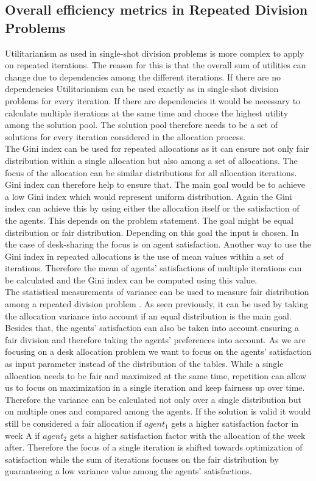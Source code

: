 \documentclass[german, a4paper, 11pt, oneside]{scrbook}
\begin{document}
\subsection{Overall efficiency metrics in Repeated Division Problems}
Utilitarianism as used in single-shot division problems is more complex to apply on repeated iterations. The reason for this is that the overall sum of utilities can change due to dependencies among the different iterations. If there are no dependencies Utilitarianism can be used exactly as in single-shot division problems for every iteration. If there are dependencies it would be necessary to calculate multiple iterations at the same time and choose the highest utility among the solution pool. The solution pool therefore needs to be a set of solutions for every iteration considered in the allocation process.\\
The Gini index can be used for repeated allocations as it can ensure not only fair distribution within a single allocation but also among a set of allocations. The focus of the allocation can be similar distributions for all allocation iterations. Gini index can therefore help to ensure that. The main goal would be to achieve a low Gini index which would represent uniform distribution. Again the Gini index can achieve this by using either the allocation itself or the satisfaction of the agents. This depends on the problem statement. The goal might be equal distribution or fair distribution. Depending on this goal the input is chosen. In the case of desk-sharing the focus is on agent satisfaction. Another way to use the Gini index in repeated allocations is the use of mean values within a set of iterations. Therefore the mean of agents' satisfactions of multiple iterations can be calculated and the Gini index can be computed using this value. 
\\
The statistical measurements of variance can be used to measure fair distribution among a repeated division problem \cite{Ek}. As seen previously, it can be used by taking the allocation variance into account if an equal distribution is the main goal. Besides that, the agents' satisfaction can also be taken into account ensuring a fair division and therefore taking the agents' preferences into account. As we are focusing on a desk allocation problem we want to focus on the agents' satisfaction as input parameter instead of the distribution of the tables. While a single allocation needs to be fair and maximized at the same time, repetition can allow us to focus on maximization in a single iteration and keep fairness up over time. Therefore the variance can be calculated not only over a single distribution but on multiple ones and compared among the agents. If the solution is valid it would still be considered a fair allocation if $agent_1$ gets a higher satisfaction factor in week A if $agent_2$ gets a higher satisfaction factor with the allocation of the week after. Therefore the focus of a single iteration is shifted towards optimization of satisfaction while the sum of iterations focuses on the fair distribution by guaranteeing a low variance value among the agents' satisfactions.
\end{document}
